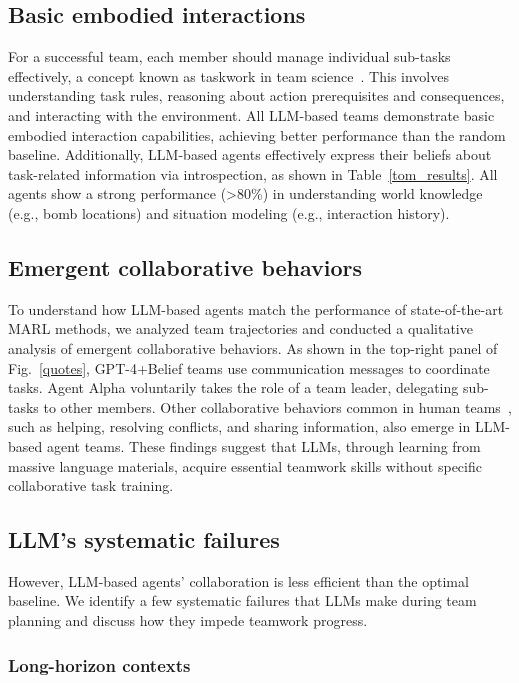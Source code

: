 \documentclass[11pt]{article}
\begin{document}
\subsection{Basic embodied interactions}

For a successful team, each member should manage individual sub-tasks effectively, a concept known as taskwork in team science~\cite{crawford2013configural}. This involves understanding task rules, reasoning about action prerequisites and consequences, and interacting with the environment. All LLM-based teams demonstrate basic embodied interaction capabilities, achieving better performance than the random baseline. Additionally, LLM-based agents effectively express their beliefs about task-related information via introspection, as shown in Table~\ref{tom_results}. All agents show a strong performance (>80\%) in understanding world knowledge (e.g., bomb locations) and situation modeling (e.g., interaction history).

\subsection{Emergent collaborative behaviors}

To understand how LLM-based agents match the performance of state-of-the-art MARL methods, we analyzed team trajectories and conducted a qualitative analysis of emergent collaborative behaviors. As shown in the top-right panel of Fig.~\ref{quotes}, GPT-4+Belief teams use communication messages to coordinate tasks. Agent Alpha voluntarily takes the role of a team leader, delegating sub-tasks to other members. Other collaborative behaviors common in human teams~\cite{fan2004modeling}, such as helping, resolving conflicts, and sharing information, also emerge in LLM-based agent teams. These findings suggest that LLMs, through learning from massive language materials, acquire essential teamwork skills without specific collaborative task training.



\subsection{LLM's systematic failures}
However, LLM-based agents' collaboration is less efficient than the optimal baseline. We identify a few systematic failures that LLMs make during team planning and discuss how they impede teamwork progress.

\subsubsection{Long-horizon contexts}
\end{document}
